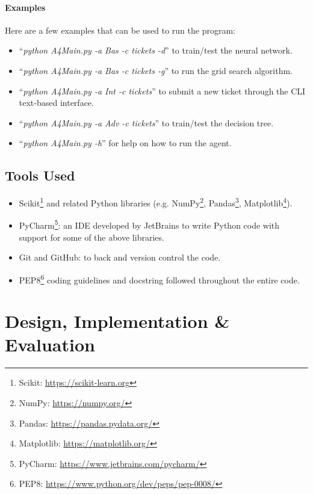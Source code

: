 \documentclass[letterpaper,12pt]{article}
\begin{document}
\paragraph{Examples}

Here are a few examples that can be used to run the program:

\begin{itemize}
    \item ``\textit{python A4Main.py -a Bas -c tickets -d}'' to train/test the neural network.
    \item ``\textit{python A4Main.py -a Bas -c tickets -g}'' to run the grid search algorithm.
    \item ``\textit{python A4Main.py -a Int -c tickets}'' to submit a new ticket through the CLI text-based interface.
    \item ``\textit{python A4Main.py -a Adv -c tickets}'' to train/test the decision tree.
    \item ``\textit{python A4Main.py -h}'' for help on how to run the agent.
\end{itemize}

\subsection{Tools Used}

\begin{itemize}
    \item Scikit\footnote{Scikit: \url{https://scikit-learn.org}} and related Python libraries (e.g. NumPy\footnote{NumPy: \url{https://numpy.org/}}, Pandas\footnote{Pandas: \url{https://pandas.pydata.org/}}, Matplotlib\footnote{Matplotlib: \url{https://matplotlib.org/}}).
    \item PyCharm\footnote{PyCharm: \url{https://www.jetbrains.com/pycharm/}}: an IDE developed by JetBrains to write Python code with support for some of the above libraries.
    \item Git and GitHub: to back and version control the code.
    \item PEP8\footnote{PEP8: \url{https://www.python.org/dev/peps/pep-0008/}} coding guidelines and docstring followed throughout the entire code.
\end{itemize}


\clearpage
\section{Design, Implementation \& Evaluation}
\label{sec:design-implementation-evaluation}
\end{document}
